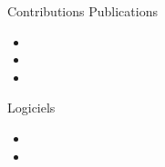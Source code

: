 \begin{frame}{Contributions}
\small
Publications
\begin{itemize}
\item {}
\item {}
\item {}
\end{itemize}
Logiciels
\begin{itemize}
\item {}
\item {}
\end{itemize}
\end{frame}
